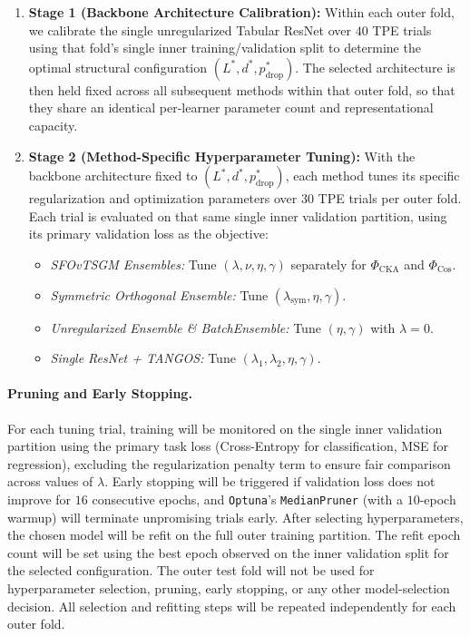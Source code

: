 \documentclass[11pt, a4paper]{article}
\begin{document}
\begin{enumerate}
    \item \textbf{Stage 1 (Backbone Architecture Calibration):} Within each outer fold, we calibrate the single unregularized Tabular ResNet over $40$ TPE trials using that fold's single inner training/validation split to determine the optimal structural configuration $(L^*, d^*, p_{\text{drop}}^*)$. The selected architecture is then held fixed across all subsequent methods within that outer fold, so that they share an identical per-learner parameter count and representational capacity.
    \item \textbf{Stage 2 (Method-Specific Hyperparameter Tuning):} With the backbone architecture fixed to $(L^*, d^*, p_{\text{drop}}^*)$, each method tunes its specific regularization and optimization parameters over $30$ TPE trials per outer fold. Each trial is evaluated on that same single inner validation partition, using its primary validation loss as the objective:
    \begin{itemize}
        \item \textit{SFOvTSGM Ensembles:} Tune $(\lambda, \nu, \eta, \gamma)$ separately for $\Phi_{\text{CKA}}$ and $\Phi_{\text{Cos}}$.
        \item \textit{Symmetric Orthogonal Ensemble:} Tune $(\lambda_{\text{sym}}, \eta, \gamma)$.
        \item \textit{Unregularized Ensemble \& BatchEnsemble:} Tune $(\eta, \gamma)$ with $\lambda = 0$.
        \item \textit{Single ResNet + TANGOS:} Tune $(\lambda_1, \lambda_2, \eta, \gamma)$.
    \end{itemize}
\end{enumerate}

\paragraph{Pruning and Early Stopping.}
For each tuning trial, training will be monitored on the single inner validation partition using the primary task loss (Cross-Entropy for classification, MSE for regression), excluding the regularization penalty term to ensure fair comparison across values of $\lambda$. Early stopping will be triggered if validation loss does not improve for $16$ consecutive epochs, and \texttt{Optuna}'s \texttt{MedianPruner} (with a $10$-epoch warmup) will terminate unpromising trials early. After selecting hyperparameters, the chosen model will be refit on the full outer training partition. The refit epoch count will be set using the best epoch observed on the inner validation split for the selected configuration. The outer test fold will not be used for hyperparameter selection, pruning, early stopping, or any other model-selection decision. All selection and refitting steps will be repeated independently for each outer fold.
\end{document}

